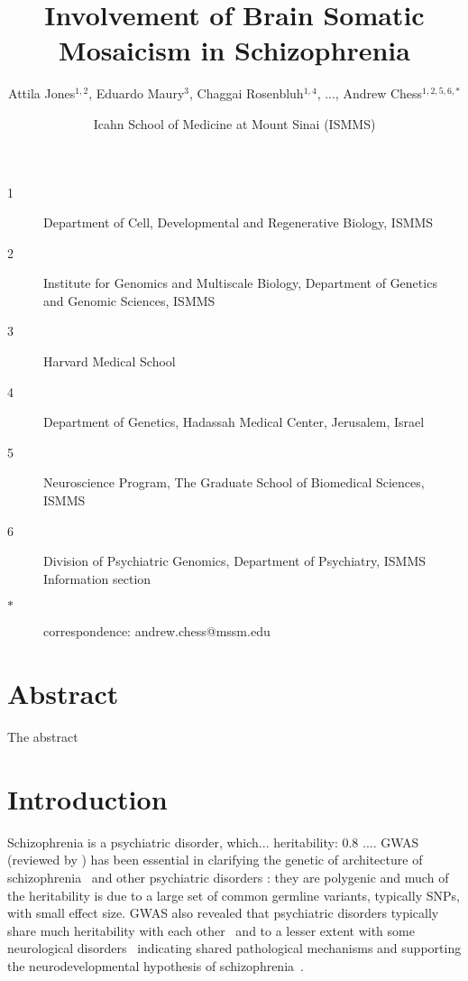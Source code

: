 \documentclass[letterpaper]{article}
\title{Involvement of Brain Somatic Mosaicism in Schizophrenia}
\author{Attila Jones\(^{1,2}\), Eduardo Maury\(^{3}\), Chaggai Rosenbluh\(^{1,4}\), ..., Andrew Chess\(^{1,2,5,6,\ast}\)}
\date{Icahn School of Medicine at Mount Sinai (ISMMS)}
\begin{document}
\maketitle

\begin{description}
\item[1] Department of Cell, Developmental and Regenerative Biology, ISMMS 
\item[2] Institute for Genomics and Multiscale Biology, Department of Genetics and Genomic Sciences, ISMMS 
\item[3] Harvard Medical School
\item[4] Department of Genetics, Hadassah Medical Center, Jerusalem, Israel
\item[5] Neuroscience Program, The Graduate School of Biomedical Sciences, ISMMS 
\item[6] Division of Psychiatric Genomics, Department of Psychiatry, ISMMS 
Information section
\item[\(\ast\)] correspondence: andrew.chess@mssm.edu 
\end{description}

\clearpage

\section*{Abstract}

The abstract

\section*{Introduction}

Schizophrenia is a psychiatric disorder, which... heritability: 0.8 ...\citep{Kahn2015}.  
GWAS (reviewed by \cite{Visscher2017}) has been essential in clarifying the
genetic of architecture of schizophrenia~\citep{Ripke2014,Pardinas2018} and other psychiatric disorders
\citep{Sullivan2012}: they are polygenic and much of the heritability is due to
a large set of common germline variants, typically SNPs, with
small effect size.  GWAS also revealed that psychiatric disorders
typically share much heritability with each
other~\citep{Consortium2009,PsychiatricGenomicsConsortium2013} and to a lesser extent with
some neurological disorders~\citep{Consortium2018} indicating shared
pathological mechanisms and supporting the neurodevelopmental hypothesis of
schizophrenia~\citep{Nour2015}.
\end{document}
